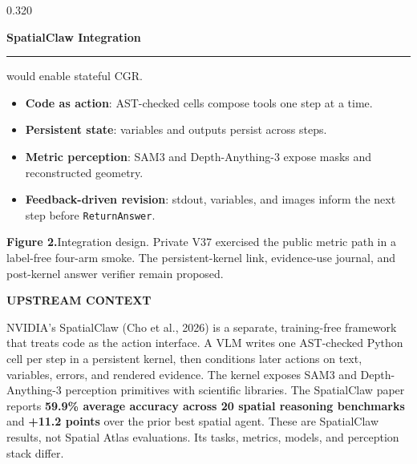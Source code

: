 \documentclass{beamer}
\newenvironment{possection}[2]{%
  \par\vspace{0.10cm}%
  \noindent{\color{ncgreendark}\bfseries\large #1}\hspace{0.42em}%
  {\color{ncink}\bfseries\large #2}\par\vspace{-0.20cm}%
  \noindent\textcolor{ncline}{\rule{\linewidth}{0.9pt}}\par\vspace{0cm}%
  \begin{minipage}{\linewidth}%
}{%
  \end{minipage}\par\vspace{0.40cm}%
}
\newcommand{\figcap}[2]{%
  \par\vspace{0.18cm}%
  \raggedright{\color{ncmuted}\normalsize\textbf{#1}\hspace{0.3em}#2\par}%
}
\begin{document}
\begin{frame}[t]
\begin{columns}[t,onlytextwidth]
\begin{column}{0.320\textwidth}
\begin{possection}{6.}{SpatialClaw Integration}
\begin{minipage}[t]{0.395\linewidth}
      would enable stateful CGR.
      \begin{itemize}
        \setlength{\topsep}{0.08cm}
        \setlength{\itemsep}{0.08cm}
        \setlength{\parsep}{0pt}
        \setlength{\partopsep}{0pt}
        \item \textbf{Code as action}: AST-checked cells compose tools one
              step at a time.
        \item \textbf{Persistent state}: variables and outputs persist across
              steps.
        \item \textbf{Metric perception}: SAM3 and Depth-Anything-3 expose
              masks and reconstructed geometry.
        \item \textbf{Feedback-driven revision}: stdout, variables, and images
              inform the next step before \texttt{ReturnAnswer}.
      \end{itemize}
    \end{minipage}
    \par
    \figcap{Figure 2.}{Integration design. Private V37 exercised the public
    metric path in a label-free four-arm smoke. The persistent-kernel link,
    evidence-use journal, and post-kernel answer verifier remain proposed.}
    \par\vspace{0.05cm}
    \begin{takeaway}
      {\ttfamily\footnotesize\bfseries\color{ncgreendark}\MakeUppercase{Upstream context}}\par
      \vspace{0.12cm}
      {\color{ncink}\normalsize NVIDIA's SpatialClaw (Cho et al., 2026) is a separate, training-free
      framework that treats code as the action interface. A VLM writes one
      AST-checked Python cell per step in a persistent kernel, then conditions
      later actions on text, variables, errors, and rendered evidence. The
      kernel exposes SAM3 and Depth-Anything-3 perception primitives with
      scientific libraries. The SpatialClaw paper reports \textbf{59.9\% average accuracy
      across 20 spatial reasoning benchmarks} and \textbf{+11.2 points} over
      the prior best spatial agent. These are SpatialClaw results, not Spatial
      Atlas evaluations. Its tasks, \mbox{metrics}, models, and perception stack
      differ.}
    \end{takeaway}
  \end{possection}


\end{column}
\end{columns}
\end{frame}
\end{document}
